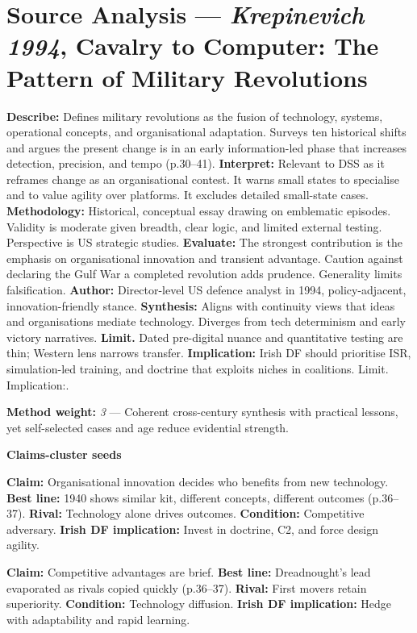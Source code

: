 \section*{Source Analysis — \textit{Krepinevich 1994}, Cavalry to Computer: The Pattern of Military Revolutions}
\textbf{Describe:} Defines military revolutions as the fusion of technology, systems, operational concepts, and organisational adaptation. Surveys ten historical shifts and argues the present change is in an early information-led phase that increases detection, precision, and tempo (p.30–41).
\textbf{Interpret:} Relevant to DSS as it reframes change as an organisational contest. It warns small states to specialise and to value agility over platforms. It excludes detailed small-state cases.
\textbf{Methodology:} Historical, conceptual essay drawing on emblematic episodes. Validity is moderate given breadth, clear logic, and limited external testing. Perspective is US strategic studies.
\textbf{Evaluate:} The strongest contribution is the emphasis on organisational innovation and transient advantage. Caution against declaring the Gulf War a completed revolution adds prudence. Generality limits falsification.
\textbf{Author:} Director-level US defence analyst in 1994, policy-adjacent, innovation-friendly stance.
\textbf{Synthesis:} Aligns with continuity views that ideas and organisations mediate technology. Diverges from tech determinism and early victory narratives.
\textbf{Limit.} Dated pre-digital nuance and quantitative testing are thin; Western lens narrows transfer.
\textbf{Implication:} Irish DF should prioritise ISR, simulation-led training, and doctrine that exploits niches in coalitions. Limit. Implication:.

\textbf{Method weight:} \textit{3} — Coherent cross-century synthesis with practical lessons, yet self-selected cases and age reduce evidential strength.

\textbf{Claims-cluster seeds}

\textbf{Claim:} Organisational innovation decides who benefits from new technology. \textbf{Best line:} 1940 shows similar kit, different concepts, different outcomes (p.36–37). \textbf{Rival:} Technology alone drives outcomes. \textbf{Condition:} Competitive adversary. \textbf{Irish DF implication:} Invest in doctrine, C2, and force design agility.

\textbf{Claim:} Competitive advantages are brief. \textbf{Best line:} Dreadnought’s lead evaporated as rivals copied quickly (p.36–37). \textbf{Rival:} First movers retain superiority. \textbf{Condition:} Technology diffusion. \textbf{Irish DF implication:} Hedge with adaptability and rapid learning.

